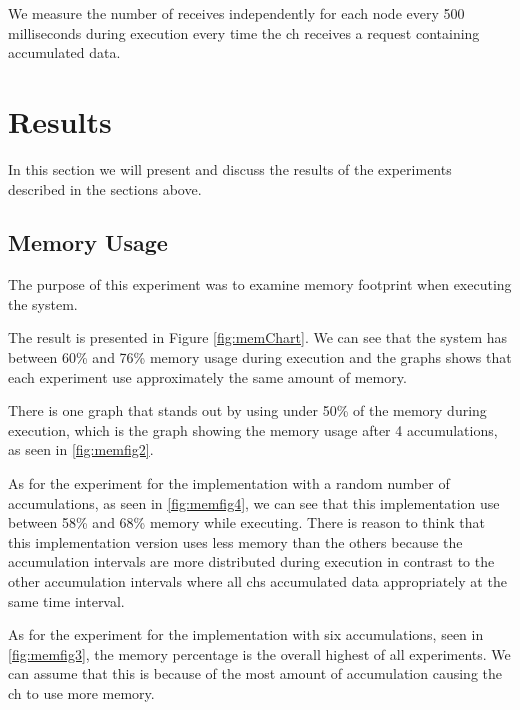 \documentclass[USenglish]{uit-thesis}
\begin{document}
We measure the number of receives independently for each node every 500 milliseconds during execution every time the \gls{ch} receives a request containing accumulated data.


\newpage

\section{Results}

In this section we will present and discuss the results of the experiments described in the sections above.

\subsection{Memory Usage}

The purpose of this experiment was to examine memory footprint when executing the system.

The result is presented in Figure \ref{fig:memChart}. We can see that the system has between 60\% and 76\% memory usage during execution and the graphs shows that each experiment use approximately the same amount of memory.

There is one graph that stands out by using under 50\% of the memory during execution, which is the graph showing the memory usage after 4 accumulations, as seen in \autoref{fig:memfig2}.

As for the experiment for the implementation with a random number of accumulations, as seen in \autoref{fig:memfig4}, we can see that this implementation use between 58\% and 68\% memory while executing. There is reason to think that this implementation version uses less memory than the others because the accumulation intervals are more distributed during execution in contrast to the other accumulation intervals where all \glspl{ch} accumulated data appropriately at the same time interval.

As for the experiment for the implementation with six accumulations, seen in \autoref{fig:memfig3}, the memory percentage is the overall highest of all experiments. We can assume that this is because of the most amount of accumulation causing the \gls{ch} to use more memory.
 
\end{document}
